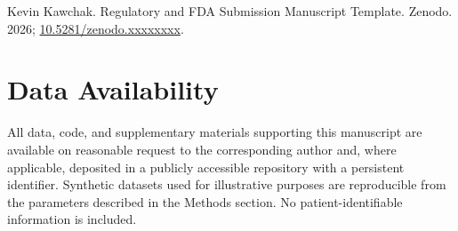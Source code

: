 Kevin Kawchak. Regulatory and FDA Submission Manuscript Template. Zenodo. 2026;
\href{https://doi.org/10.5281/zenodo.xxxxxxxx}{10.5281/zenodo.xxxxxxxx}.

{}
\section*{Data Availability}
\label{sec:data}

All data, code, and supplementary materials supporting this manuscript are
available on reasonable request to the corresponding author and, where
applicable, deposited in a publicly accessible repository with a persistent
identifier. Synthetic datasets used for illustrative purposes are
reproducible from the parameters described in the Methods section. No
patient-identifiable information is included.
